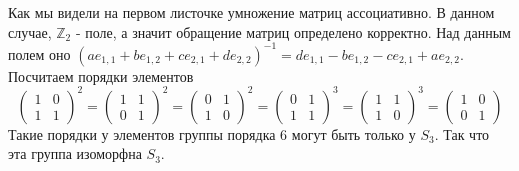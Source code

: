 \documentclass{article}
\begin{document}
\begin{enumerate}
        Как мы видели на первом листочке умножение матриц ассоциативно. В данном
        случае, $\mathbb{Z}_2$ - поле, а значит обращение матриц определено
        корректно. Над данным полем оно $(ae_{1,1}+be_{1,2}+ce_{2,1}+de_{2,2})^{-1}=
        de_{1,1}-be_{1,2}-ce_{2,1}+ae_{2,2}$. Посчитаем порядки элементов
        \[
            \left(\begin{array}{cc}1&0\\1&1\end{array}\right)^2=
            \left(\begin{array}{cc}1&1\\0&1\end{array}\right)^2=
            \left(\begin{array}{cc}0&1\\1&0\end{array}\right)^2=
            \left(\begin{array}{cc}0&1\\1&1\end{array}\right)^3=
            \left(\begin{array}{cc}1&1\\1&0\end{array}\right)^3=
            \left(\begin{array}{cc}1&0\\0&1\end{array}\right)
        \]
        Такие порядки у элементов группы порядка 6 могут быть только у $S_3$.
        Так что эта группа изоморфна $S_3$.


\end{enumerate}
\end{document}
